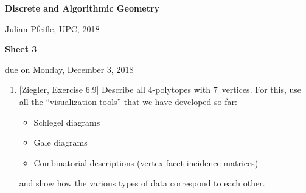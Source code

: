 \documentclass[11pt]{amsart}
\begin{document}
\begin{center}
\textbf{\sffamily
   Discrete and Algorithmic Geometry }

\medskip
   Julian Pfeifle,
   UPC, 2018
\end{center}


\begin{center}
  \textbf{\sffamily Sheet 3}

\bigskip
 due on Monday, December 3, 2018

\end{center}

\bigskip
\bigskip
\bigskip

\begin{enumerate}
\item {}[Ziegler, Exercise 6.9] Describe all $4$-polytopes with $7$~vertices. For this, use all the ``visualization tools'' that we have developed so far:
  \begin{itemize}
  \item Schlegel diagrams
  \item Gale diagrams
  \item Combinatorial descriptions (vertex-facet incidence matrices)
  \end{itemize}
  and show how the various types of data correspond to each other.


\end{enumerate}
\end{document}
